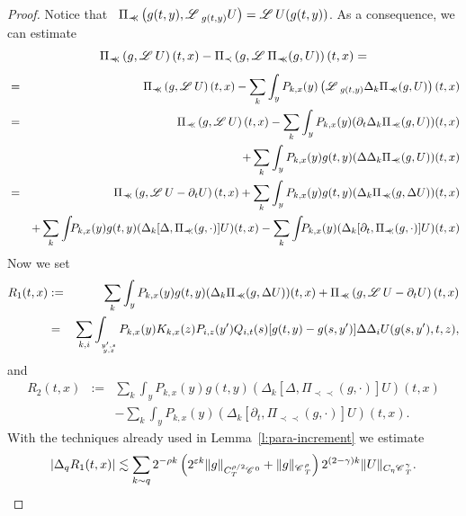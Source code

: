 \documentclass[11pt,reqno]{amsart}
\newcommand{\assign}{:=}
\newcommand{\precprec}{\prec\!\!\!\prec}
\newcommand{\CC}{\mathscr{C} \hspace{.1em}}
\newcommand{\LL}{\mathscr{L} \hspace{.2em}}
\begin{document}
\begin{proof}
  Notice that \ $\Pi_{\precprec} \left( g (t, y), \LL_{g (t, y)} U \right) =
  \LL U (g (t, y))$. As a consequence, we can estimate
  \[ \Pi_{\precprec} \left( g, \LL U \right) (t, x) - \Pi_{\prec} \left( g,
     \LL \Pi_{\precprec} (g, U) \right) (t, x) = \]
  \begin{eqnarray*}
    & = & \Pi_{\precprec} \left( g, \LL U \right) (t, x) - \sum_k \int_y
    P_{k, x} (y) \left( \LL_{g (t, y)} \Delta_k \Pi_{\precprec} (g, U) \right)
    (t, x)\\
    & = & \Pi_{\precprec} \left( g, \LL U \right) (t, x) - \sum_k \int_y
    P_{k, x} (y) (\partial_t \Delta_k \Pi_{\precprec} (g, U)) (t, x)\\
    &  & + \sum_k \int_y P_{k, x} (y) g (t, y) (\Delta \Delta_k
    \Pi_{\precprec} (g, U)) (t, x)\\
    & = & \Pi_{\precprec} \left( g, \LL U - \partial_t U \right) (t, x) +
    \sum_k \int_y P_{k, x} (y) g (t, y) (\Delta_k \Pi_{\precprec} (g, \Delta
    U)) (t, x)\\
    &  & + \sum_k \int_{} P_{k, x} (y) g (t, y) (\Delta_k [\Delta,
    \Pi_{\precprec} (g, \cdot)] U) (t, x) - \sum_k \int_{} P_{k, x} (y)
    (\Delta_k [\partial_t, \Pi_{\precprec} (g, \cdot)] U) (t, x)
  \end{eqnarray*}
  Now we set
  \begin{eqnarray*}
    R_1 (t, x) & \assign & \sum_k \int_y P_{k, x} (y) g (t, y) (\Delta_k
    \Pi_{\precprec} (g, \Delta U)) (t, x) + \Pi_{\precprec} \left( g, \LL U -
    \partial_t U \right) (t, x)\\
    & = & \sum_{k, i} \int_{_{\overset{y', s}{y, z}}} P_{k, x} (y) K_{k, x}
    (z) P_{i, z} (y') Q_{i, t} (s) [g (t, y) - g (s, y')] \Delta \Delta_i U (g
    (s, y'), t, z),
  \end{eqnarray*}
  and
  \begin{eqnarray*}
    R_2 (t, x) & \assign & \sum_k \int_y P_{k, x} (y) g (t, y) (\Delta_k
    [\Delta, \Pi_{\precprec} (g, \cdot)] U) (t, x)\\
    &  & - \sum_k \int_y P_{k, x} (y) (\Delta_k [\partial_t, \Pi_{\precprec}
    (g, \cdot)] U) (t, x) .
  \end{eqnarray*}
  With the techniques already used in Lemma~\ref{l:para-increment} we estimate
  \[ | \Delta_q R_1 (t, x) | \lesssim \sum_{k \sim q} 2^{- \rho k} \left(
     2^{\varepsilon k} \| g \|_{C_T^{\rho / 2} \CC^0} + \| g \|_{\CC^{\rho}_T}
     \right) 2^{(2 - \gamma) k} \| U \|_{C_{\eta} \CC^{\gamma}_T} . \]

\end{proof}
\end{document}
